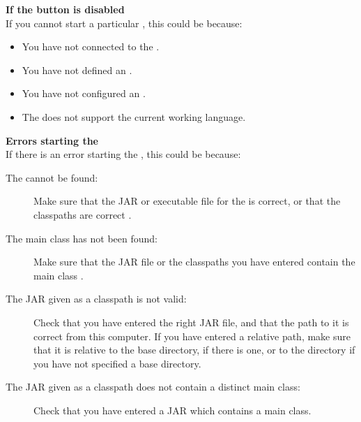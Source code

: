 % 
%
%
\textbf{If the \gdaut{} button is disabled}\\
If you cannot start a particular \gdaut{}, this could be because:

\begin{itemize}
\item You have not connected to the \gdagent {}.
\item You have not defined an \gdaut{} .
\item You have not configured an \gdaut{} .
\item The \gdaut{} does not support the current working language. 
\end{itemize}

\textbf{Errors starting the \gdaut{}}\\
If there is an error starting the \gdaut{}, this could be because:
\begin{description}
\item [The \gdaut{} cannot be found:]{Make sure that the JAR or executable file for the \gdaut{} is correct, or that the classpaths are correct .}
\item [The main class has not been found:]{Make sure that the JAR file or the classpaths you have entered contain the main class . }
\item[The JAR given as a classpath is not valid:]{Check that you have entered the right JAR file, and that the path to it is correct from this computer. If you have entered a relative path, make sure that it is relative to the \gdaut{} base directory, if there is one, or to the \gdagent directory if you have not specified a \gdaut{} base directory. }
\item[The JAR given as a classpath does not contain a distinct  main 
class:]{Check that you have entered a JAR which contains a main class.}

\end{description}

